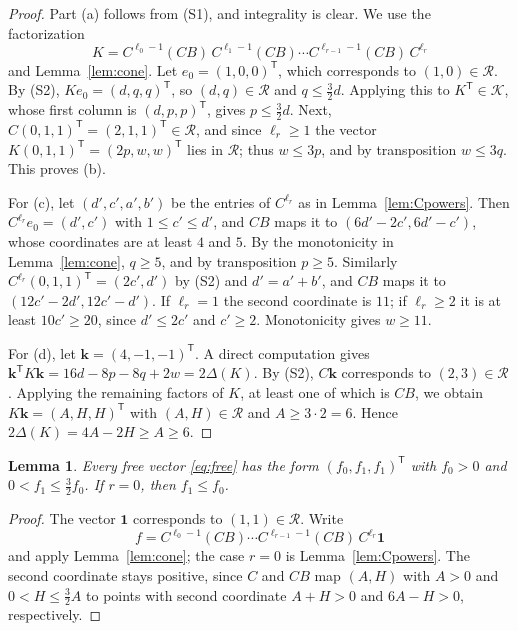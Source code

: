 \documentclass{amsart}
\newtheorem{lemma}[theorem]{Lemma}
\theoremstyle{definition}
\theoremstyle{remark}
\numberwithin{equation}{section}
\newcommand{\one}{\mathbf{1}}
\newcommand{\cK}{\mathcal{K}}
\newcommand{\cC}{\mathcal{R}}
\begin{document}
\begin{proof}
Part (a) follows from (S1), and integrality is clear. We use the factorization
\[
K=C^{\ell_0-1}(CB)\,C^{\ell_1-1}(CB)\cdots C^{\ell_{r-1}-1}(CB)\,C^{\ell_r}
\]
and Lemma~\ref{lem:cone}. Let $e_0=(1,0,0)^{\mathsf T}$, which corresponds to $(1,0)\in\cC$. By (S2), $Ke_0=(d,q,q)^{\mathsf T}$, so $(d,q)\in\cC$ and $q\le\frac32d$. Applying this to $K^{\mathsf T}\in\cK$, whose first column is $(d,p,p)^{\mathsf T}$, gives $p\le\frac32d$. Next, $C(0,1,1)^{\mathsf T}=(2,1,1)^{\mathsf T}\in\cC$, and since $\ell_r\ge1$ the vector $K(0,1,1)^{\mathsf T}=(2p,w,w)^{\mathsf T}$ lies in $\cC$; thus $w\le3p$, and by transposition $w\le3q$. This proves (b).

For (c), let $(d',c',a',b')$ be the entries of $C^{\ell_r}$ as in Lemma~\ref{lem:Cpowers}. Then $C^{\ell_r}e_0=(d',c')$ with $1\le c'\le d'$, and $CB$ maps it to $(6d'-2c',6d'-c')$, whose coordinates are at least $4$ and $5$. By the monotonicity in Lemma~\ref{lem:cone}, $q\ge5$, and by transposition $p\ge5$. Similarly $C^{\ell_r}(0,1,1)^{\mathsf T}=(2c',d')$ by (S2) and $d'=a'+b'$, and $CB$ maps it to $(12c'-2d',12c'-d')$. If $\ell_r=1$ the second coordinate is $11$; if $\ell_r\ge2$ it is at least $10c'\ge20$, since $d'\le2c'$ and $c'\ge2$. Monotonicity gives $w\ge11$.

For (d), let $\mathbf k=(4,-1,-1)^{\mathsf T}$. A direct computation gives $\mathbf k^{\mathsf T}K\mathbf k=16d-8p-8q+2w=2\Delta(K)$. By (S2), $C\mathbf k$ corresponds to $(2,3)\in\cC$. Applying the remaining factors of $K$, at least one of which is $CB$, we obtain $K\mathbf k=(A,H,H)^{\mathsf T}$ with $(A,H)\in\cC$ and $A\ge3\cdot2=6$. Hence $2\Delta(K)=4A-2H\ge A\ge6$.
\end{proof}

\begin{lemma}\label{lem:free}
Every free vector \eqref{eq:free} has the form $(f_0,f_1,f_1)^{\mathsf T}$ with $f_0>0$ and $0<f_1\le\frac32f_0$. If $r=0$, then $f_1\le f_0$.
\end{lemma}

\begin{proof}
The vector $\one$ corresponds to $(1,1)\in\cC$. Write
\[
f=C^{\ell_0-1}(CB)\cdots C^{\ell_{r-1}-1}(CB)\,C^{\ell_r}\one
\]
and apply Lemma~\ref{lem:cone}; the case $r=0$ is Lemma~\ref{lem:Cpowers}. The second coordinate stays positive, since $C$ and $CB$ map $(A,H)$ with $A>0$ and $0<H\le\frac32A$ to points with second coordinate $A+H>0$ and $6A-H>0$, respectively.
\end{proof}
\end{document}
